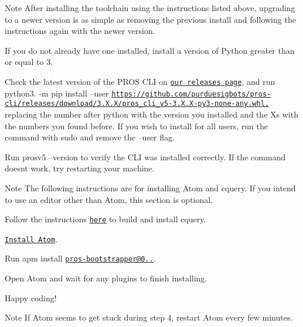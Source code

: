 \begin{DoxyNote}{Note}
After installing the toolchain using the instructions listed above, upgrading to a newer version is as simple as removing the previous install and following the instructions again with the newer version.
\end{DoxyNote}



\begin{DoxyEnumerate}
\item If you do not already have one installed, install a version of Python greater than or equal to 3.
\item Check the latest version of the P\+R\+OS C\+LI on \href{https://github.com/purduesigbots/pros-cli3/releases/latest}{\tt our releases page}, and run python3. -\/m pip install --user \href{https://github.com/purduesigbots/pros-cli/releases/download/3.X.X/pros_cli_v5-3.X.X-py3-none-any.whl,}{\tt https\+://github.\+com/purduesigbots/pros-\/cli/releases/download/3.\+X.\+X/pros\+\_\+cli\+\_\+v5-\/3.\+X.\+X-\/py3-\/none-\/any.\+whl,} replacing the number after \textquotesingle{}python\textquotesingle{} with the version you installed and the Xs with the numbers you found before. If you wish to install for all users, run the command with sudo and remove the --user flag.
\item Run prosv5 --version to verify the C\+LI was installed correctly. If the command doesn\textquotesingle{}t work, try restarting your machine.
\end{DoxyEnumerate}

\begin{DoxyNote}{Note}
The following instructions are for installing Atom and cquery. If you intend to use an editor other than Atom, this section is optional.
\end{DoxyNote}

\begin{DoxyEnumerate}
\item Follow the instructions \href{https://github.com/cquery-project/cquery/wiki/Building-cquery}{\tt here} to build and install cquery.
\item \href{https://atom.io}{\tt Install Atom}.
\item Run apm install \href{mailto:pros-bootstrapper@0.0.12}{\tt pros-\/bootstrapper@0..}.
\item Open Atom and wait for any plugins to finish installing.
\item Happy coding!
\end{DoxyEnumerate}

\begin{DoxyNote}{Note}
If Atom seems to get stuck during step 4, restart Atom every few minutes. 
\end{DoxyNote}
